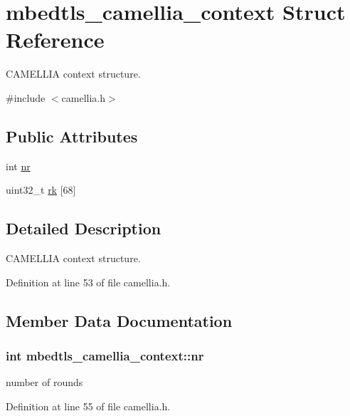 \hypertarget{structmbedtls__camellia__context}{\section{mbedtls\-\_\-camellia\-\_\-context Struct Reference}
\label{structmbedtls__camellia__context}
}


C\-A\-M\-E\-L\-L\-I\-A context structure.  




{\ttfamily \#include $<$camellia.\-h$>$}

\subsection*{Public Attributes}
\begin{DoxyCompactItemize}
\item 
int \hyperlink{structmbedtls__camellia__context_a63d45ee2d45dfd67ef01ad9c1ca9c8d8}{nr}
\item 
uint32\-\_\-t \hyperlink{structmbedtls__camellia__context_ab5d709c14cdfa36ac163bfd973324f19}{rk} \mbox{[}68\mbox{]}
\end{DoxyCompactItemize}


\subsection{Detailed Description}
C\-A\-M\-E\-L\-L\-I\-A context structure. 

Definition at line 53 of file camellia.\-h.



\subsection{Member Data Documentation}
\hypertarget{structmbedtls__camellia__context_a63d45ee2d45dfd67ef01ad9c1ca9c8d8}{
\subsubsection[{nr}]{\setlength{\rightskip}{0pt plus 5cm}int mbedtls\-\_\-camellia\-\_\-context\-::nr}}\label{structmbedtls__camellia__context_a63d45ee2d45dfd67ef01ad9c1ca9c8d8}
number of rounds 

Definition at line 55 of file camellia.\-h.

